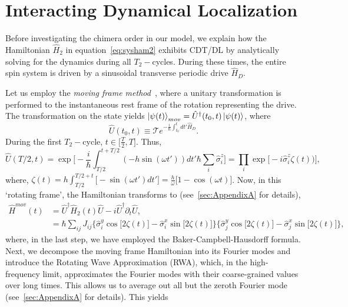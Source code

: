 \documentclass[12pt]{iopart}
\begin{document}
\section{\label{sec:level2} Interacting Dynamical Localization}

Before investigating the chimera order in our model, we explain how the Hamiltonian $\hat{H}_2$ in equation~\eqref{eq:sysham2} exhibits CDT/DL by analytically solving for the dynamics during all $T_2-$cycles. During these times,  the entire spin system is driven by a sinusoidal transverse periodic drive $\hat{H}_D$.
	
Let us employ the \textit{moving frame method}~\cite{haldar_dynamical_2021}, where a unitary transformation is performed to the instantaneous rest frame of the rotation representing the drive. The transformation on the state yields $\ket{\psi(t)}_{mov} = \hat{U}^\dagger(t_0,t) \ket{\psi(t)}$, where 
\begin{equation}
    \hat{U}(t_0,t) \equiv \mathcal{T} e^{-\frac{i}{\hbar}\int_{t_0}^{t} dt' \hat{H}_D}.
    \label{eq:rot1}
\end{equation}
During the first $T_2-$cycle, $t \in{\Big[\frac{T}{2}, T \Big]}$. Thus,
\begin{equation}
    \hat{U}\left(T/2,t\right) = \exp \Bigg[-\frac{i}{\hbar}\int_{T/2}^{t+T/2} (-h \sin(\omega t'))dt'\hbar\sum_i\hat{\sigma}^z_i\Bigg]
    = \prod_{i} \exp\Big[-i \hat{\sigma}^z_i\zeta(t))\Big],
\end{equation}
where, $\displaystyle{
    \zeta (t) = h\int_{T/2}^{T/2+t}  \Big[-\sin(\omega t')dt'\Big]=  \frac{h}{\omega}\Big[1-\cos(\omega t)\Big]}$.		
Now, in this `rotating frame', the Hamiltonian transforms to (see~\ref{sec:AppendixA} for details),
\begin{align}
    \hat{H}^{mov}(t) &= \hat{U}^\dagger \hat{H}_2(t) \hat{U}- i \hat{U}^\dagger \partial_t \hat{U},\nonumber\\
    &=\hbar\sum_{ij}J_{ij}\Big\{\hat{\sigma}^y_i\cos{\big[2\zeta(t)\big]}-\hat{\sigma}^x_i\sin{\big[2\zeta(t)\big]}\Big\}\Big\{\hat{\sigma}^y_j\cos{\big[2\zeta(t)\big]}-\hat{\sigma}^x_j\sin{\big[2\zeta(t)\big]}\Big\},
    \label{eq:movham}
\end{align}
where, in the last step, we have employed the Baker-Campbell-Hausdorff formula. Next, we decompose the moving frame Hamiltonian into its Fourier modes and introduce the Rotating Wave Approximation (RWA), which, in the high-frequency limit, approximates the Fourier modes with their coarse-grained values over long times. This allows us to average out all but the zeroth Fourier mode (see~\ref{sec:AppendixA} for details). This yields
\end{document}
